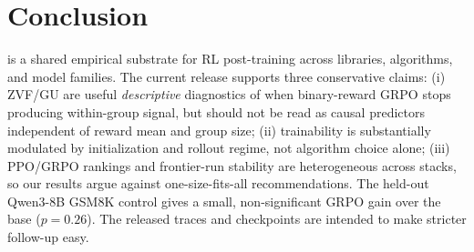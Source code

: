 \section{Conclusion}
\label{sec:conclusion}

\ours{} is a shared empirical substrate for RL post-training across libraries,
algorithms, and model families. The current release supports three
conservative claims: (i) ZVF/GU are useful \emph{descriptive} diagnostics of
when binary-reward GRPO stops producing within-group signal, but should not be
read as causal predictors independent of reward mean and group size; (ii)
trainability is substantially modulated by initialization and rollout regime,
not algorithm choice alone; (iii) PPO/GRPO rankings and frontier-run stability
are heterogeneous across stacks, so our results argue against one-size-fits-all
recommendations. The held-out Qwen3-8B GSM8K control gives a small,
non-significant GRPO gain over the base ($p{=}0.26$). The released traces and
checkpoints are intended to make stricter follow-up easy.
